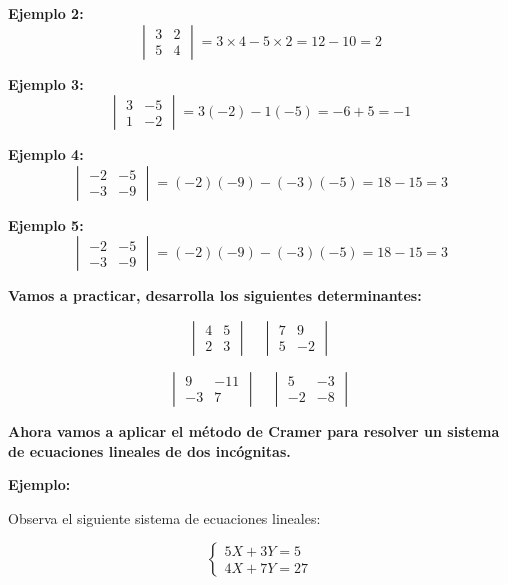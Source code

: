 \documentclass[12pt,a4paper]{article}
\begin{document}
\textbf{Ejemplo 2:}
\[ \begin{vmatrix} 3 & 2 \\ 5 & 4 \end{vmatrix} = 3 \times 4 - 5 \times 2 = 12 - 10 = 2 \]

\textbf{Ejemplo 3:}
\[ \begin{vmatrix} 3 & -5 \\ 1 & -2 \end{vmatrix} = 3(-2) - 1(-5) = -6 + 5 = -1 \]

\textbf{Ejemplo 4:}
\[ \begin{vmatrix} -2 & -5 \\ -3 & -9 \end{vmatrix} = (-2)(-9) - (-3)(-5) = 18 - 15 = 3 \]

\textbf{Ejemplo 5:}
\[ \begin{vmatrix} -2 & -5 \\ -3 & -9 \end{vmatrix} = (-2)(-9) - (-3)(-5) = 18 - 15 = 3 \]

\vspace{1cm}

\textbf{Vamos a practicar, desarrolla los siguientes determinantes:}

\[ \begin{vmatrix} 4 & 5 \\ 2 & 3 \end{vmatrix} \quad \begin{vmatrix} 7 & 9 \\ 5 & -2 \end{vmatrix} \]

\[ \begin{vmatrix} 9 & -11 \\ -3 & 7 \end{vmatrix} \quad \begin{vmatrix} 5 & -3 \\ -2 & -8 \end{vmatrix} \]

\vspace{1cm}

\textbf{Ahora vamos a aplicar el método de Cramer para resolver un sistema de ecuaciones lineales de dos incógnitas.}

\textbf{Ejemplo:}

Observa el siguiente sistema de ecuaciones lineales:

\[ \begin{cases}
5X + 3Y = 5 \\
4X + 7Y = 27
\end{cases} \]
\end{document}
